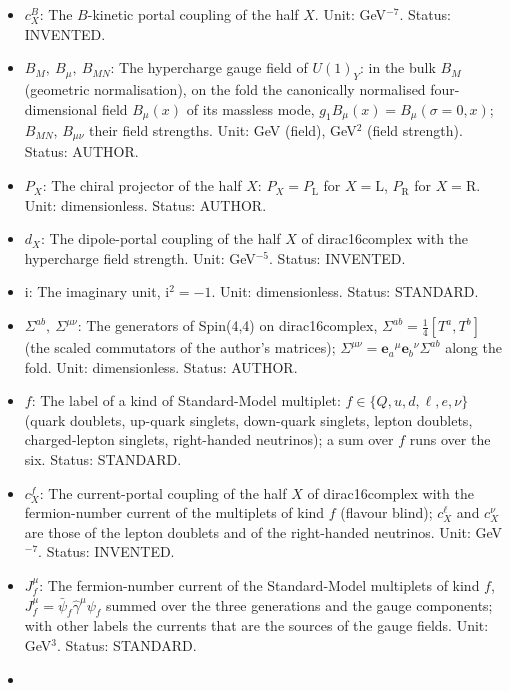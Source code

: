 \documentclass[
  10pt,
]{article}
\begin{document}
\begin{itemize}
  a repeated index is summed. Status: STANDARD.
\item
  \(c^{B}_X\): The \(B\)-kinetic portal coupling of the half \(X\).
  Unit: GeV\(^{-7}\). Status: INVENTED.
\item
  \(B_M,\ B_\mu,\ B_{MN}\): The hypercharge gauge field of \(U(1)_Y\):
  in the bulk \(B_M\) (geometric normalisation), on the fold the
  canonically normalised four-dimensional field \(B_\mu(x)\) of its
  massless mode, \(g_1B_\mu(x) = B_\mu(\sigma = 0, x)\); \(B_{MN}\),
  \(B_{\mu\nu}\) their field strengths. Unit: GeV (field), GeV\(^2\)
  (field strength). Status: AUTHOR.
\item
  \(P_X\): The chiral projector of the half \(X\):
  \(P_X = P_{\mathrm{L}}\) for \(X = \mathrm{L}\), \(P_{\mathrm{R}}\)
  for \(X = \mathrm{R}\). Unit: dimensionless. Status: AUTHOR.
\item
  \(d_X\): The dipole-portal coupling of the half \(X\) of
  dirac16complex with the hypercharge field strength. Unit:
  GeV\(^{-5}\). Status: INVENTED.
\item
  \(\mathrm{i}\): The imaginary unit, \(\mathrm{i}^2 = -1\). Unit:
  dimensionless. Status: STANDARD.
\item
  \(\Sigma^{ab},\ \Sigma^{\mu\nu}\): The generators of Spin(4,4) on
  dirac16complex, \(\Sigma^{ab} = \frac14[T^a, T^b]\) (the scaled
  commutators of the author's matrices);
  \(\Sigma^{\mu\nu} = \mathbf{e}_a{}^\mu\mathbf{e}_b{}^\nu\Sigma^{ab}\)
  along the fold. Unit: dimensionless. Status: AUTHOR.
\item
  \(f\): The label of a kind of Standard-Model multiplet:
  \(f \in \{Q, u, d, \ell, e, \nu\}\) (quark doublets, up-quark
  singlets, down-quark singlets, lepton doublets, charged-lepton
  singlets, right-handed neutrinos); a sum over \(f\) runs over the six.
  Status: STANDARD.
\item
  \(c^{f}_X\): The current-portal coupling of the half \(X\) of
  dirac16complex with the fermion-number current of the multiplets of
  kind \(f\) (flavour blind); \(c^{\ell}_X\) and \(c^{\nu}_X\) are those
  of the lepton doublets and of the right-handed neutrinos. Unit:
  GeV\(^{-7}\). Status: INVENTED.
\item
  \(J_f^\mu\): The fermion-number current of the Standard-Model
  multiplets of kind \(f\), \(J_f^\mu = \bar\psi_f\hat\gamma^\mu\psi_f\)
  summed over the three generations and the gauge components; with other
  labels the currents that are the sources of the gauge fields. Unit:
  GeV\(^3\). Status: STANDARD.
\item

\end{itemize}
\end{document}
